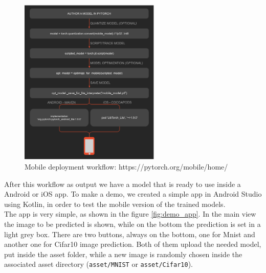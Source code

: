 \documentclass[12pt, letterpaper, twoside]{article}
\begin{document}
\begin{figure}[H]
	\centering
	\includegraphics[width=0.6\textwidth]{pytorch-mobile.png}
	\caption{Mobile deployment workflow: https://pytorch.org/mobile/home/}
	\label{fig:pytorch_mobile}
\end{figure}

After this workflow as output we have a model that is ready to use inside a Android or iOS app. To make a demo, we created a simple app in Android Studio using Kotlin, in order to test the mobile version of the trained models.\\
The app is very simple, as shown in the figure \ref{fig:demo_app}. In the main view the image to be predicted is shown, while on the bottom the prediction is set in a light grey box. There are two buttons, always on the bottom, one for Mnist and another one for Cifar10 image prediction. Both of them upload the needed model, put inside the asset folder, while a new image is randomly chosen inside the associated asset directory (\verb|asset/MNIST| or \verb|asset/Cifar10|).
\end{document}
